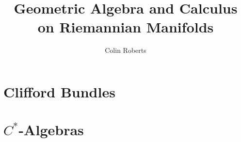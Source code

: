 \documentclass[12pt]{article}
\title{Geometric Algebra and Calculus on Riemannian Manifolds}
\author{Colin Roberts}
\begin{document}
\maketitle

\section{Clifford Bundles}


\section{$C^*$-Algebras}



 
\end{document}
